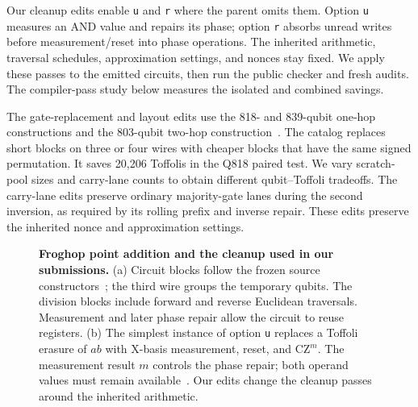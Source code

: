 \documentclass[aps,prx,reprint,raggedbottom,superscriptaddress,longbibliography,floatfix]{revtex4-2}
\newcommand{\code}[1]{\texttt{#1}}
\begin{document}
Our cleanup edits enable \code{u} and \code{r} where the parent omits them.
Option \code{u} measures an AND value and repairs its phase; option \code{r} absorbs unread writes before measurement/reset into phase operations.
The inherited arithmetic, traversal schedules, approximation settings, and nonces stay fixed.
We apply these passes to the emitted circuits, then run the public checker and fresh audits.
The compiler-pass study below measures the isolated and combined savings.

The gate-replacement and layout edits use the 818- and 839-qubit one-hop constructions and the 803-qubit two-hop construction~\cite{frontierextensions}.
The catalog replaces short blocks on three or four wires with cheaper blocks that have the same signed permutation.
It saves 20,206 Toffolis in the Q818 paired test.
We vary scratch-pool sizes and carry-lane counts to obtain different qubit--Toffoli tradeoffs.
The carry-lane edits preserve ordinary majority-gate lanes during the second inversion, as required by its rolling prefix and inverse repair.
These edits preserve the inherited nonce and approximation settings.

\begin{figure}[!tp]
\centering
\resizebox{\textwidth}{!}{}
\caption{\textbf{Froghop point addition and the cleanup used in our submissions.}
(a) Circuit blocks follow the frozen source constructors~\cite{froghopsources}; the third wire groups the temporary qubits.
The division blocks include forward and reverse Euclidean traversals.
Measurement and later phase repair allow the circuit to reuse registers.
(b) The simplest instance of option \code{u} replaces a Toffoli erasure of $ab$ with X-basis measurement, reset, and $\mathrm{CZ}^{m}$.
The measurement result $m$ controls the phase repair; both operand values must remain available~\cite{gidney,gidneyblog}.
Our edits change the cleanup passes around the inherited arithmetic.}
\label{fig:froghop}
\end{figure}
\end{document}
